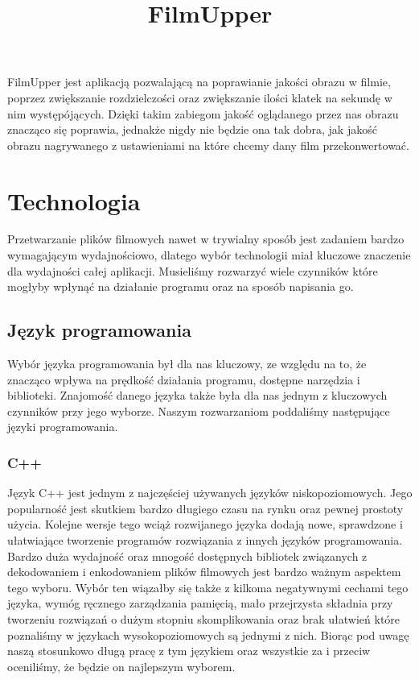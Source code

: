 \documentclass[twoside]{projektInzynierskiMS}
\title{FilmUpper}
\begin{document}
FilmUpper jest aplikacją pozwalającą na poprawianie jakości obrazu w filmie, poprzez zwiększanie rozdzielczości oraz zwiększanie ilości klatek na sekundę w nim występójących. Dzięki takim zabiegom jakość oglądanego przez nas obrazu znacząco się poprawia, jednakże nigdy nie będzie ona tak dobra, jak jakość obrazu nagrywanego z ustawieniami na które chcemy dany film przekonwertować. 



\section{Technologia}


Przetwarzanie plików filmowych nawet w trywialny sposób jest zadaniem bardzo wymagającym wydajnościowo, dlatego wybór technologii miał kluczowe znaczenie dla wydajności całej aplikacji. Musieliśmy rozwarzyć wiele czynników które mogłyby wpłynąć na działanie programu oraz na sposób napisania go.


\subsection{Język programowania}

Wybór języka programowania był dla nas kluczowy, ze względu na to, że znacząco wpływa na prędkość działania programu, dostępne narzędzia i biblioteki. Znajomość danego języka także była dla nas jednym z kluczowych czynników przy jego wyborze. Naszym rozwarzaniom poddaliśmy następujące języki programowania.

\subsubsection{C++}
Język C++ jest jednym z najczęściej używanych języków niskopoziomowych. Jego popularność jest skutkiem bardzo długiego czasu na rynku oraz pewnej prostoty użycia. Kolejne wersje tego wciąż rozwijanego języka dodają nowe, sprawdzone i ułatwiające tworzenie programów rozwiązania z innych języków programowania. Bardzo duża wydajność oraz mnogość dostępnych bibliotek związanych z dekodowaniem i enkodowaniem plików filmowych jest bardzo ważnym aspektem tego wyboru. Wybór ten wiązałby się także z kilkoma negatywnymi cechami tego języka, wymóg ręcznego zarządzania pamięcią, mało przejrzysta składnia przy tworzeniu rozwiązań o dużym stopniu skomplikowania oraz brak ułatwień które poznaliśmy w językach wysokopoziomowych są jednymi z nich. Biorąc pod uwagę naszą stosunkowo długą pracę z tym językiem oraz wszystkie za i przeciw oceniliśmy, że będzie on najlepszym wyborem.
\end{document}
